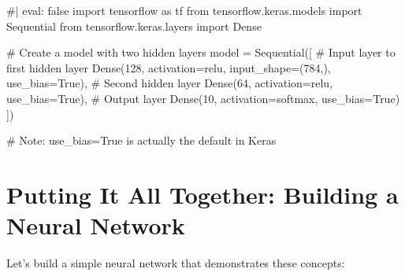 \documentclass[
  letterpaper,
  DIV=11,
  numbers=noendperiod]{scrreprt}
\newenvironment{Shaded}{\begin{snugshade}}{\end{snugshade}}
\newcommand{\CommentTok}[1]{\textcolor[rgb]{0.37,0.37,0.37}{#1}}
\newcommand{\DecValTok}[1]{\textcolor[rgb]{0.68,0.00,0.00}{#1}}
\newcommand{\ImportTok}[1]{\textcolor[rgb]{0.00,0.46,0.62}{#1}}
\newcommand{\NormalTok}[1]{\textcolor[rgb]{0.00,0.23,0.31}{#1}}
\newcommand{\OperatorTok}[1]{\textcolor[rgb]{0.37,0.37,0.37}{#1}}
\newcommand{\StringTok}[1]{\textcolor[rgb]{0.13,0.47,0.30}{#1}}
\newcommand{\VariableTok}[1]{\textcolor[rgb]{0.07,0.07,0.07}{#1}}
\begin{document}
\begin{Shaded}
\begin{Highlighting}[]
\CommentTok{\#| eval: false}
\ImportTok{import}\NormalTok{ tensorflow }\ImportTok{as}\NormalTok{ tf}
\ImportTok{from}\NormalTok{ tensorflow.keras.models }\ImportTok{import}\NormalTok{ Sequential}
\ImportTok{from}\NormalTok{ tensorflow.keras.layers }\ImportTok{import}\NormalTok{ Dense}

\CommentTok{\# Create a model with two hidden layers}
\NormalTok{model }\OperatorTok{=}\NormalTok{ Sequential([}
    \CommentTok{\# Input layer to first hidden layer}
\NormalTok{    Dense(}\DecValTok{128}\NormalTok{, activation}\OperatorTok{=}\StringTok{\textquotesingle{}relu\textquotesingle{}}\NormalTok{, input\_shape}\OperatorTok{=}\NormalTok{(}\DecValTok{784}\NormalTok{,), use\_bias}\OperatorTok{=}\VariableTok{True}\NormalTok{),}
    \CommentTok{\# Second hidden layer}
\NormalTok{    Dense(}\DecValTok{64}\NormalTok{, activation}\OperatorTok{=}\StringTok{\textquotesingle{}relu\textquotesingle{}}\NormalTok{, use\_bias}\OperatorTok{=}\VariableTok{True}\NormalTok{),}
    \CommentTok{\# Output layer}
\NormalTok{    Dense(}\DecValTok{10}\NormalTok{, activation}\OperatorTok{=}\StringTok{\textquotesingle{}softmax\textquotesingle{}}\NormalTok{, use\_bias}\OperatorTok{=}\VariableTok{True}\NormalTok{)}
\NormalTok{])}

\CommentTok{\# Note: use\_bias=True is actually the default in Keras}
\end{Highlighting}
\end{Shaded}

\section{Putting It All Together: Building a Neural
Network}\label{putting-it-all-together-building-a-neural-network}

Let's build a simple neural network that demonstrates these concepts:
\end{document}
